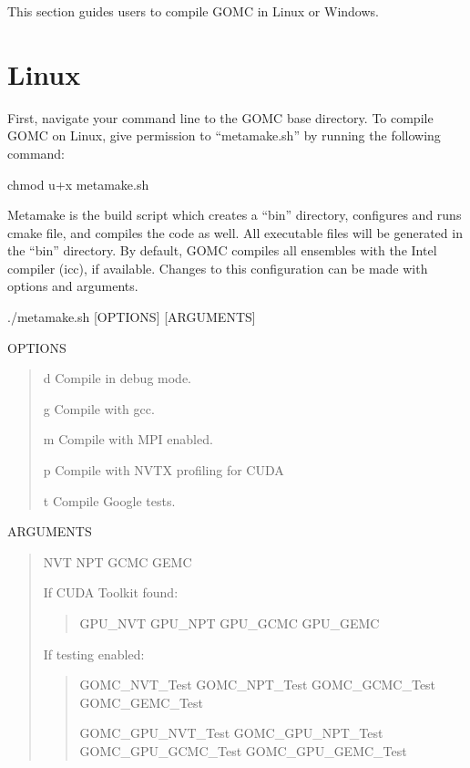 \documentclass[letterpaper,10pt,english]{sphinxmanual}
\begin{document}
\sphinxAtStartPar
This section guides users to compile GOMC in Linux or Windows.


\section{Linux}
\label{\detokenize{compiling:linux}}
\sphinxAtStartPar
First, navigate your command line to the GOMC base directory. To compile GOMC on Linux, give permission to “metamake.sh” by running the following command:

\begin{sphinxVerbatim}[commandchars=\\\{\}]
\PYGZdl{} chmod u+x metamake.sh
\end{sphinxVerbatim}

\sphinxAtStartPar
Metamake is the build script which creates a “bin” directory, configures and runs cmake file, and compiles the code as well. All executable files will be generated in the “bin” directory.  By default, GOMC compiles all ensembles with the Intel compiler (icc), if available.  Changes to this configuration can be made with options and arguments.

\sphinxAtStartPar
./metamake.sh {[}OPTIONS{]} {[}ARGUMENTS{]}

\sphinxAtStartPar
OPTIONS
\begin{quote}
\begin{optionlist}{3cm}
\item [\sphinxhyphen{}d]  
\sphinxAtStartPar
Compile in debug mode.
\item [\sphinxhyphen{}g]  
\sphinxAtStartPar
Compile with gcc.
\item [\sphinxhyphen{}m]  
\sphinxAtStartPar
Compile with MPI enabled.
\item [\sphinxhyphen{}p]  
\sphinxAtStartPar
Compile with NVTX profiling for CUDA
\item [\sphinxhyphen{}t]  
\sphinxAtStartPar
Compile Google tests.
\end{optionlist}
\end{quote}

\sphinxAtStartPar
ARGUMENTS
\begin{quote}

\sphinxAtStartPar
NVT
NPT
GCMC
GEMC

\sphinxAtStartPar
If CUDA Toolkit found:
\begin{quote}

\sphinxAtStartPar
GPU\_NVT
GPU\_NPT
GPU\_GCMC
GPU\_GEMC
\end{quote}

\sphinxAtStartPar
If testing enabled:
\begin{quote}

\sphinxAtStartPar
GOMC\_NVT\_Test
GOMC\_NPT\_Test
GOMC\_GCMC\_Test
GOMC\_GEMC\_Test

\sphinxAtStartPar
GOMC\_GPU\_NVT\_Test
GOMC\_GPU\_NPT\_Test
GOMC\_GPU\_GCMC\_Test
GOMC\_GPU\_GEMC\_Test
\end{quote}
\end{quote}
\end{document}
